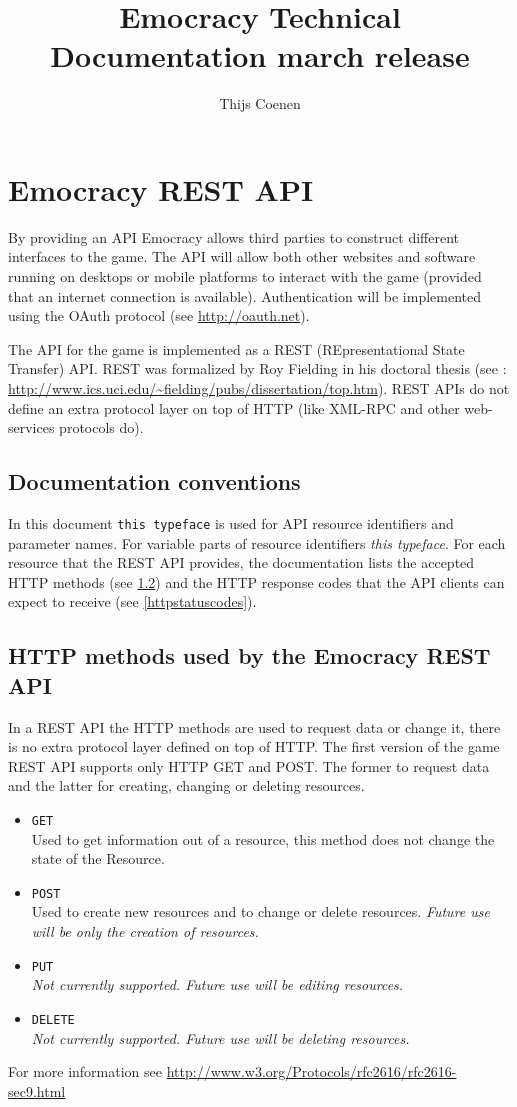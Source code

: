 \documentclass[a4paper]{report}
\author{Thijs Coenen}
\title{Emocracy Technical Documentation march release}
\begin{document}
\maketitle
\tableofcontents
\chapter{Emocracy REST API}
By providing an API Emocracy allows third parties to construct different 
interfaces to the game. The API will allow both other websites and 
software running on desktops or mobile platforms to interact with the game 
(provided that an internet connection is available). Authentication will be 
implemented using the OAuth protocol (see \url{http://oauth.net}).

The API for the game is implemented as a REST (REpresentational State Transfer) 
API. REST was formalized by Roy Fielding in his doctoral thesis (see : 
\url{http://www.ics.uci.edu/\~fielding/pubs/dissertation/top.htm}). REST APIs do
not define an extra protocol layer on top of HTTP (like XML-RPC and other 
web-services protocols do).

\section{Documentation conventions}
In this document \texttt{this typeface} is used for API resource identifiers 
and parameter names. For variable parts of resource identifiers \emph{this 
typeface}. For each resource that the REST API provides, the documentation lists
the accepted HTTP methods (see \ref{httpmethods}) and the HTTP response codes 
that the API clients can expect to receive (see \ref{httpstatuscodes}).

\section{HTTP methods used by the Emocracy REST API}\label{httpmethods}
In a REST API the HTTP methods are used to request data or change it, there is
no extra protocol layer defined on top of HTTP. The first version of the game
REST API supports only HTTP GET and POST. The former to request data and the 
latter for creating, changing or deleting resources.
\begin{itemize}
    \item{\texttt{GET}\\
    Used to get information out of a resource, this method does not change the 
    state of the Resource.}
    \item{\texttt{POST}\\
    Used to create new resources and to change or delete resources. 
    \emph{Future use will be only the creation of resources.}}
    \item{\texttt{PUT}\\
    \emph{Not currently supported. Future use will be editing resources.}}
    \item{\texttt{DELETE}\\
    \emph{Not currently supported. Future use will be deleting resources.}}
\end{itemize}
For more information see \mbox{\url{http://www.w3.org/Protocols/rfc2616/rfc2616-sec9.html}}
\end{document}
